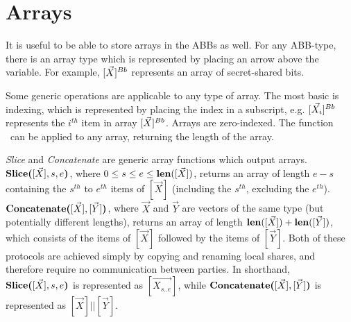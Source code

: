 \section{Arrays}

It is useful to be able to store arrays in the ABBs as well.
For any ABB-type, there is an array type which is represented by
placing an arrow above the variable.
For example, $[\vec{X}]^{Bb}$ represents an array of secret-shared bits.

Some generic operations are applicable to any type of array.
The most basic is indexing, which is represented by placing the
index in a subscript, e.g. $[\vec{X_i}]^{Bb}$ represents the $i^{th}$
item in array $[\vec{X}]^{Bb}$. 
Arrays are zero-indexed.
The function \len~can be applied to any array, returning the length 
of the array.

\emph{Slice} and \emph{Concatenate} are generic array functions
which output arrays.
$\textbf{Slice(}[\vec{X}], s, e\textbf{)}$, where $0 \leq s \leq e \leq \textbf{len}([\vec{X}])$,
returns an array of length $e-s$ containing the $s^{th}$ to $e^{th}$
items of $[\vec{X}]$ (including the $s^{th}$, excluding the $e^{th}$).
$\textbf{Concatenate(}[\vec{X}], [\vec{Y}]\textbf{)}$, 
where $\vec{X}$ and $\vec{Y}$ are vectors of the same type (but potentially 
different lengths),
returns an array of length $\textbf{len}([\vec{X}]) + \textbf{len}([\vec{Y}])$,
which consists of the items of $[\vec{X}]$ followed by the items of $[\vec{Y}]$.
Both of these protocols are achieved simply by copying and renaming local shares,
and therefore require no communication between parties.
In shorthand, $\textbf{Slice(}[\vec{X}], s, e\textbf{)}$ is represented as $[\vec{X_{s..e}}]$,
while $\textbf{Concatenate(}[\vec{X}], [\vec{Y}]\textbf{)}$ is represented as $[\vec{X}] || [\vec{Y}]$.
